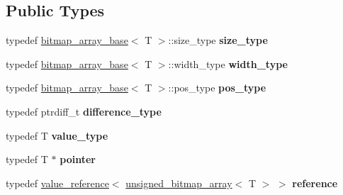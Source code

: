 \subsection*{Public Types}
\begin{DoxyCompactItemize}
\item 
\mbox{\label{classdialog_1_1unsigned__bitmap__array_a4310b8ce4e699979c8de82dd6ec68b6c}} 
typedef \hyperlink{classdialog_1_1bitmap__array__base}{bitmap\+\_\+array\+\_\+base}$<$ T $>$\+::size\+\_\+type {\bfseries size\+\_\+type}
\item 
\mbox{\label{classdialog_1_1unsigned__bitmap__array_a5c11af0fe1193e79f8b3b47db67a5bac}} 
typedef \hyperlink{classdialog_1_1bitmap__array__base}{bitmap\+\_\+array\+\_\+base}$<$ T $>$\+::width\+\_\+type {\bfseries width\+\_\+type}
\item 
\mbox{\label{classdialog_1_1unsigned__bitmap__array_a9f098b2a9fb1226c3b704cd5ce427f72}} 
typedef \hyperlink{classdialog_1_1bitmap__array__base}{bitmap\+\_\+array\+\_\+base}$<$ T $>$\+::pos\+\_\+type {\bfseries pos\+\_\+type}
\item 
\mbox{\label{classdialog_1_1unsigned__bitmap__array_a860b7fca544641f35ac7581077f41a67}} 
typedef ptrdiff\+\_\+t {\bfseries difference\+\_\+type}
\item 
\mbox{\label{classdialog_1_1unsigned__bitmap__array_a2c404d9ac20eeff687759a0b2c3a33d4}} 
typedef T {\bfseries value\+\_\+type}
\item 
\mbox{\label{classdialog_1_1unsigned__bitmap__array_a4f1798c22124d6d6a16b36ed075ffb05}} 
typedef T $\ast$ {\bfseries pointer}
\item 
\mbox{\label{classdialog_1_1unsigned__bitmap__array_a3a8d29bcd0353f355f8687cb5fb97423}} 
typedef \hyperlink{classdialog_1_1value__reference}{value\+\_\+reference}$<$ \hyperlink{classdialog_1_1unsigned__bitmap__array}{unsigned\+\_\+bitmap\+\_\+array}$<$ T $>$ $>$ {\bfseries reference}
\item 
\mbox{\label{classdialog_1_1unsigned__bitmap__array_a8d54fc9d097c1af9503cd3949c242a3f}} 

\end{DoxyCompactItemize}
